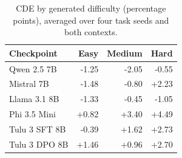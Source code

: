 \begin{table}[t]
\centering\scriptsize
\caption{CDE by generated difficulty (percentage points), averaged over four task seeds and both contexts.}
\label{tab:difficulty-cde}
\begin{tabular}{@{}lrrr@{}}
\toprule
Checkpoint & Easy & Medium & Hard \\
\midrule
Qwen 2.5 7B & -1.25 & -2.05 & -0.55 \\
Mistral 7B & -1.48 & -0.80 & +2.23 \\
Llama 3.1 8B & -1.33 & -0.45 & -1.05 \\
Phi 3.5 Mini & +0.82 & +3.40 & +4.49 \\
Tulu 3 SFT 8B & -0.39 & +1.62 & +2.73 \\
Tulu 3 DPO 8B & +1.46 & +0.96 & +2.70 \\
\bottomrule
\end{tabular}
\end{table}
